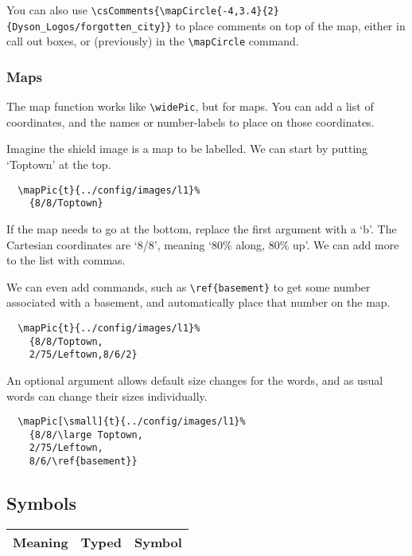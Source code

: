 \documentclass[a4paper,openany]{book}
\begin{document}
\begin{multicols}{2}

You can also use \verb"\csComments{\mapCircle{-4,3.4}{2}{Dyson_Logos/forgotten_city}}" to place comments on top of the map, either in call out boxes, or (previously) in the \verb"\mapCircle" command.

\subsubsection{Maps}

The map function works like \verb"\widePic", but for maps.
You can add a list of coordinates, and the names or number-labels to place on those coordinates.


Imagine the shield image is a map to be labelled.
We can start by putting `Toptown' at the top.

\begin{verbatim}
  \mapPic{t}{../config/images/l1}%
    {8/8/Toptown}
\end{verbatim}

If the map needs to go at the bottom, replace the first argument with a `b'.
The Cartesian coordinates are `8/8', meaning `80\% along, 80\% up'.
We can add more to the list with commas.

We can even add commands, such as \verb"\ref{basement}" to get some number associated with a basement, and automatically place that number on the map.

\begin{verbatim}
  \mapPic{t}{../config/images/l1}%
    {8/8/Toptown,
    2/75/Leftown,8/6/2}
\end{verbatim}

An optional argument allows default size changes for the words, and as usual words can change their sizes individually.

\begin{verbatim}
  \mapPic[\small]{t}{../config/images/l1}%
    {8/8/\large Toptown,
    2/75/Leftown,
    8/6/\ref{basement}}
\end{verbatim}

\subsection{Symbols}

\begin{tabularx}{\linewidth}{Xcc}

  Meaning & Typed & Symbol \\\hline


\end{tabularx}
\end{multicols}
\end{document}

